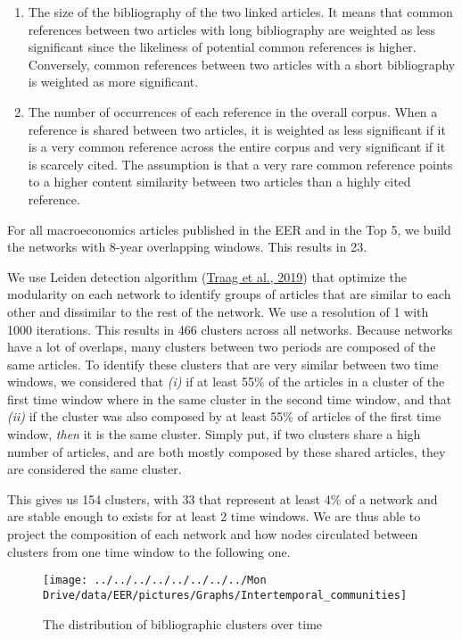 \documentclass[
]{article}
\providecommand{\tightlist}{%
  \setlength{\itemsep}{0pt}\setlength{\parskip}{0pt}}
\begin{document}
\begin{enumerate}
\def\labelenumi{\arabic{enumi}.}
\tightlist
\item
  The size of the bibliography of the two linked articles. It means that
  common references between two articles with long bibliography are
  weighted as less significant since the likeliness of potential common
  references is higher. Conversely, common references between two
  articles with a short bibliography is weighted as more significant.
\item
  The number of occurrences of each reference in the overall corpus.
  When a reference is shared between two articles, it is weighted as
  less significant if it is a very common reference across the entire
  corpus and very significant if it is scarcely cited. The assumption is
  that a very rare common reference points to a higher content
  similarity between two articles than a highly cited reference.
\end{enumerate}

For all macroeconomics articles published in the EER and in the Top 5,
we build the networks with 8-year overlapping windows. This results in
23.

We use Leiden detection algorithm
(\protect\hyperlink{ref-traag2019}{Traag et al., 2019}) that optimize
the modularity on each network to identify groups of articles that are
similar to each other and dissimilar to the rest of the network. We use
a resolution of 1 with 1000 iterations. This results in 466 clusters
across all networks. Because networks have a lot of overlaps, many
clusters between two periods are composed of the same articles. To
identify these clusters that are very similar between two time windows,
we considered that \emph{(i)} if at least 55\% of the articles in a
cluster of the first time window where in the same cluster in the second
time window, and that \emph{(ii)} if the cluster was also composed by at
least 55\% of articles of the first time window, \emph{then} it is the
same cluster. Simply put, if two clusters share a high number of
articles, and are both mostly composed by these shared articles, they
are considered the same cluster.

This gives us 154 clusters, with 33 that represent at least 4\% of a
network and are stable enough to exists for at least 2 time windows. We
are thus able to project the composition of each network and how nodes
circulated between clusters from one time window to the following one.

\begin{figure}[h]

{\centering \texttt{[image: ../../../../../../../../Mon Drive/data/EER/pictures/Graphs/Intertemporal\_communities]} 

}

\caption{The distribution of bibliographic clusters over time}\label{fig:plot-cluster-flow}
\end{figure}
\end{document}
